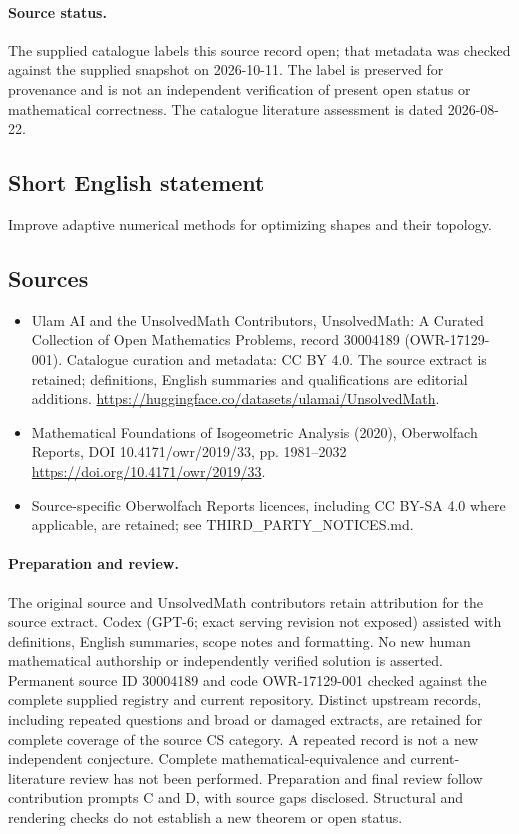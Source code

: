 \documentclass[11pt]{article}
\begin{document}
\paragraph{Source status.}
The supplied catalogue labels this source record open; that metadata was checked against the supplied snapshot on 2026-10-11. The label is preserved for provenance and is not an independent verification of present open status or mathematical correctness. The catalogue literature assessment is dated 2026-08-22.
\subsection{Short English statement}
Improve adaptive numerical methods for optimizing shapes and their topology.
\subsection{Sources}
\begin{itemize}
\item[\hypertarget{source:30004189:1}{S1}] Ulam AI and the UnsolvedMath Contributors, UnsolvedMath: A Curated Collection of Open Mathematics Problems, record 30004189 (OWR-17129-001). Catalogue curation and metadata: CC BY 4.0. The source extract is retained; definitions, English summaries and qualifications are editorial additions.
\url{https://huggingface.co/datasets/ulamai/UnsolvedMath}.
\item[\hypertarget{source:30004189:2}{S2}] Mathematical Foundations of Isogeometric Analysis (2020), Oberwolfach Reports, DOI 10.4171/owr/2019/33, pp. 1981--2032
\url{https://doi.org/10.4171/owr/2019/33}.
\item Source-specific Oberwolfach Reports licences, including CC BY-SA 4.0 where applicable, are retained; see THIRD\_PARTY\_NOTICES.md.
\end{itemize}
\paragraph{Preparation and review.}
The original source and UnsolvedMath contributors retain attribution for the source extract. Codex (GPT-6; exact serving revision not exposed) assisted with definitions, English summaries, scope notes and formatting. No new human mathematical authorship or independently verified solution is asserted. Permanent source ID 30004189 and code OWR-17129-001 checked against the complete supplied registry and current repository. Distinct upstream records, including repeated questions and broad or damaged extracts, are retained for complete coverage of the source CS category. A repeated record is not a new independent conjecture. Complete mathematical-equivalence and current-literature review has not been performed. Preparation and final review follow contribution prompts C and D, with source gaps disclosed. Structural and rendering checks do not establish a new theorem or open status.
\label{end:30004189}
\end{document}
